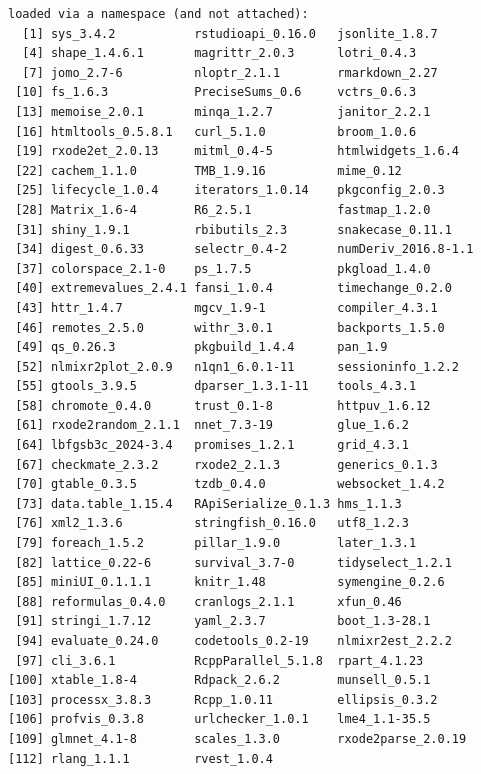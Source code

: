 \documentclass[
]{article}
\begin{document}
\begin{verbatim}
loaded via a namespace (and not attached):
  [1] sys_3.4.2           rstudioapi_0.16.0   jsonlite_1.8.7     
  [4] shape_1.4.6.1       magrittr_2.0.3      lotri_0.4.3        
  [7] jomo_2.7-6          nloptr_2.1.1        rmarkdown_2.27     
 [10] fs_1.6.3            PreciseSums_0.6     vctrs_0.6.3        
 [13] memoise_2.0.1       minqa_1.2.7         janitor_2.2.1      
 [16] htmltools_0.5.8.1   curl_5.1.0          broom_1.0.6        
 [19] rxode2et_2.0.13     mitml_0.4-5         htmlwidgets_1.6.4  
 [22] cachem_1.1.0        TMB_1.9.16          mime_0.12          
 [25] lifecycle_1.0.4     iterators_1.0.14    pkgconfig_2.0.3    
 [28] Matrix_1.6-4        R6_2.5.1            fastmap_1.2.0      
 [31] shiny_1.9.1         rbibutils_2.3       snakecase_0.11.1   
 [34] digest_0.6.33       selectr_0.4-2       numDeriv_2016.8-1.1
 [37] colorspace_2.1-0    ps_1.7.5            pkgload_1.4.0      
 [40] extremevalues_2.4.1 fansi_1.0.4         timechange_0.2.0   
 [43] httr_1.4.7          mgcv_1.9-1          compiler_4.3.1     
 [46] remotes_2.5.0       withr_3.0.1         backports_1.5.0    
 [49] qs_0.26.3           pkgbuild_1.4.4      pan_1.9            
 [52] nlmixr2plot_2.0.9   n1qn1_6.0.1-11      sessioninfo_1.2.2  
 [55] gtools_3.9.5        dparser_1.3.1-11    tools_4.3.1        
 [58] chromote_0.4.0      trust_0.1-8         httpuv_1.6.12      
 [61] rxode2random_2.1.1  nnet_7.3-19         glue_1.6.2         
 [64] lbfgsb3c_2024-3.4   promises_1.2.1      grid_4.3.1         
 [67] checkmate_2.3.2     rxode2_2.1.3        generics_0.1.3     
 [70] gtable_0.3.5        tzdb_0.4.0          websocket_1.4.2    
 [73] data.table_1.15.4   RApiSerialize_0.1.3 hms_1.1.3          
 [76] xml2_1.3.6          stringfish_0.16.0   utf8_1.2.3         
 [79] foreach_1.5.2       pillar_1.9.0        later_1.3.1        
 [82] lattice_0.22-6      survival_3.7-0      tidyselect_1.2.1   
 [85] miniUI_0.1.1.1      knitr_1.48          symengine_0.2.6    
 [88] reformulas_0.4.0    cranlogs_2.1.1      xfun_0.46          
 [91] stringi_1.7.12      yaml_2.3.7          boot_1.3-28.1      
 [94] evaluate_0.24.0     codetools_0.2-19    nlmixr2est_2.2.2   
 [97] cli_3.6.1           RcppParallel_5.1.8  rpart_4.1.23       
[100] xtable_1.8-4        Rdpack_2.6.2        munsell_0.5.1      
[103] processx_3.8.3      Rcpp_1.0.11         ellipsis_0.3.2     
[106] profvis_0.3.8       urlchecker_1.0.1    lme4_1.1-35.5      
[109] glmnet_4.1-8        scales_1.3.0        rxode2parse_2.0.19 
[112] rlang_1.1.1         rvest_1.0.4        
\end{verbatim}
\end{document}
